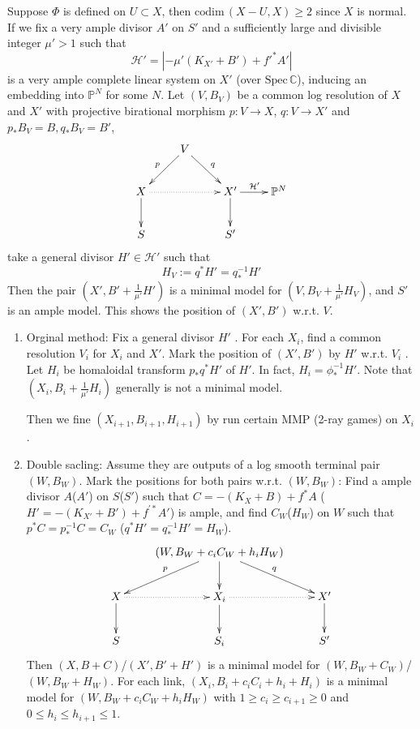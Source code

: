 \documentclass{article}
\begin{document}
Suppose $ \Phi $ is defined on $ U\subset X $, then $ \mathrm{codim}\,(X-U,X)\geqslant 2 $ since $ X $ is normal. If we fix a very ample divisor $ A'  $ on $ S' $ and a sufficiently large and divisible integer $ \mu'>1 $ such that
$$ \mathcal{H}'=|-\mu' (K_{X'}+B') +f'^*A'| $$
is a very ample complete linear system on $ X' $ (over $ \mathrm{Spec}\,\mathbb{C} $),  inducing an embedding into $ \mathbb{P}^N $ for some $ N $.  Let $ (V,B_V) $ be a common log resolution of $ X $ and $ X' $  with projective birational morphism $ p:V\to X$,   $q:V\to X' $ and $p_*B_V=B, q_*B_V=B' $,
$$ \xymatrix{
  &V\ar[ld]_p\ar[rd]^{q}&&\\
  X\ar[d]\ar@{.>}[rr]&&X'\ar[d]\ar[r]^{\mathcal{H}'}&\mathbb{P}^N\\
S&&S'} $$
take a general divisor $ H'\in \mathcal{H}' $ such that
$$ H_V:=q^*H'=q^{-1}_*H' $$ Then the pair $ (X',B'+\frac{1}{\mu'}H') $ is a minimal model for $ (V,B_V+\frac{1}{\mu'}H_V) $, and $ S' $ is an ample model. This shows the position of  $ (X',B') $ w.r.t. $ V $.
\begin{enumerate}
  \item Orginal method: Fix a general divisor $ H' $ . For each $ X_i $, find a common resolution $ V_i $ for $ X_i $ and $ X' $. Mark the position of $ (X',B') $ by $ H' $ w.r.t. $ V_i $ . Let $ H_i $ be homaloidal transform $ p_*q^*H' $ of $ H' $. In fact, $ H_i=\phi^{-1}_*H' $. Note that $ (X_i,B_i+\frac{1}{\mu'}H_i) $ generally is not a minimal model.

    Then we fine $ (X_{i+1},B_{i+1},H_{i+1}) $ by run certain MMP (2-ray games) on $ X_i $.
  \item Double sacling: Assume they are outputs of a log smooth terminal pair $ (W,B_W) $. Mark the positions for both pairs w.r.t. $ (W,B_W) $: Find a ample divisor $ A $($ A' $) on $ S $($ S' $) such that $ C=-(K_X+B)+f^*A $ ($ H'=-(K_{X'}+B')+f^{'*}A' $) is ample, and find $ C_W $($ H_W $) on $ W $ such that $ p^*C=p^{-1}_*C=C_W $ ($ q^*H'=q^{-1}_*H'=H_W $).
    $$ \xymatrix{
      &(W,B_W+c_iC_W+h_iH_W)\ar[d]\ar[ld]_p\ar[rd]^{q}&\\
      X\ar[d]\ar@{.>}[r]&X_i\ar@{.>}[r]\ar[d]&X'\ar[d]\\
    S&S_i&S'} $$
    Then $ (X,B+C) $/$ (X',B'+H') $ is a minimal model for $ (W,B_W+C_W) $/$ (W,B_W+H_W) $. For each link, $ (X_i,B_i+c_iC_i+h_i+H_i) $ is a minimal model for $ (W,B_W+c_iC_W+h_iH_W) $ with $ 1\geqslant c_i\geqslant c_{i+1}\geqslant 0 $ and $ 0\leqslant h_i\leqslant h_{i+1}\leqslant 1 $.
\end{enumerate}
\end{document}
